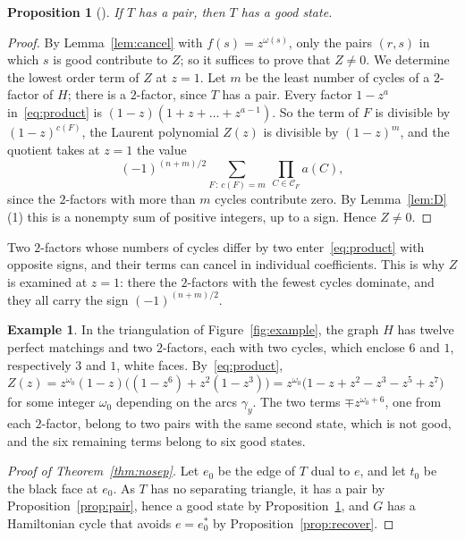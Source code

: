 \documentclass[a4paper]{amsart}
\numberwithin{equation}{section}
\newtheorem{proposition}[equation]{Proposition}
\theoremstyle{definition}
\newtheorem{example}[equation]{Example}
\newcommand{\cC}{\mathcal C}
\begin{document}
\begin{proposition}[{\cite[Proposition~5.1]{OpenAI}}]\label{prop:good}
If $T$ has a pair, then $T$ has a good state.
\end{proposition}

\begin{proof}
By Lemma~\ref{lem:cancel} with $f(s)=z^{\omega(s)}$, only the pairs $(r,s)$ in which $s$ is good contribute to $Z$; so it suffices to prove that $Z\neq0$.
We determine the lowest order term of $Z$ at $z=1$.
Let $m$ be the least number of cycles of a $2$-factor of $H$; there is a $2$-factor, since $T$ has a pair.
Every factor $1-z^{a}$ in~\eqref{eq:product} is $(1-z)(1+z+\dots+z^{a-1})$.
So the term of $F$ is divisible by $(1-z)^{c(F)}$, the Laurent polynomial $Z(z)$ is divisible by $(1-z)^m$, and the quotient takes at $z=1$ the value
\begin{equation}\label{eq:leading}
(-1)^{(n+m)/2}\sum_{F\,:\,c(F)=m}\ \prod_{C\in\cC_F}a(C),
\end{equation}
since the $2$-factors with more than $m$ cycles contribute zero.
By Lemma~\ref{lem:D}(1) this is a nonempty sum of positive integers, up to a sign.
Hence $Z\ne0$.
\end{proof}

Two $2$-factors whose numbers of cycles differ by two enter~\eqref{eq:product} with opposite signs, and their terms can cancel in individual coefficients.
This is why $Z$ is examined at $z=1$: there the $2$-factors with the fewest cycles dominate, and they all carry the sign $(-1)^{(n+m)/2}$.

\begin{example}\label{ex:example}
In the triangulation of Figure~\ref{fig:example}, the graph $H$ has twelve perfect matchings and two $2$-factors, each with two cycles, which enclose $6$ and $1$, respectively $3$ and $1$, white faces.
By~\eqref{eq:product}, $Z(z)=z^{\omega_0}(1-z)\bigl((1-z^6)+z^2(1-z^3)\bigr)=z^{\omega_0}\bigl(1-z+z^2-z^3-z^5+z^7\bigr)$ for some integer $\omega_0$ depending on the arcs $\gamma_y$.
The two terms $\mp z^{\omega_0+6}$, one from each $2$-factor, belong to two pairs with the same second state, which is not good, and the six remaining terms belong to six good states.
\end{example}

\begin{proof}[Proof of Theorem~\ref{thm:nosep}]
Let $e_0$ be the edge of $T$ dual to $e$, and let $t_0$ be the black face at $e_0$.
As $T$ has no separating triangle, it has a pair by Proposition~\ref{prop:pair}, hence a good state by Proposition~\ref{prop:good}, and $G$ has a Hamiltonian cycle that avoids $e=e_0^*$ by Proposition~\ref{prop:recover}.
\end{proof}
\end{document}
